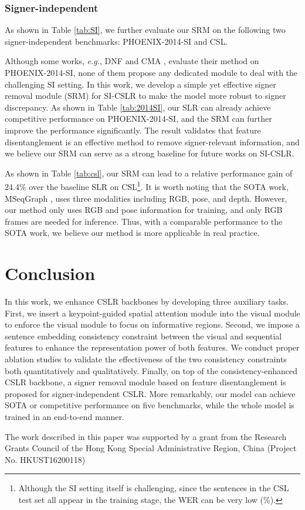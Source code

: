 \documentclass[acmsmall,screen]{acmart}
\def\eg{\emph{e.g.}} \def\Eg{\emph{E.g.}}
\begin{document}
 \subsubsection{Signer-independent}
As shown in Table \ref{tab:SI}, we further evaluate our SRM on the following two signer-independent benchmarks: PHOENIX-2014-SI and CSL.

Although some works, \eg, DNF \cite{dnf} and CMA \cite{cma}, evaluate their method on PHOENIX-2014-SI, none of them propose any dedicated module to deal with the challenging SI setting.
In this work, we develop a simple yet effective signer removal module (SRM) for SI-CSLR to make the model more robust to signer discrepancy. 
As shown in Table \ref{tab:2014SI}, our SLR can already achieve competitive performance on PHOENIX-2014-SI, and the SRM can further improve the performance significantly.
The result validates that feature disentanglement is an effective method to remove signer-relevant information, and we believe our SRM can serve as a strong baseline for future works on SI-CSLR.

As shown in Table \ref{tab:csl}, our SRM can lead to a relative performance gain of 24.4\% over the baseline SLR on CSL\footnote{Although the SI setting itself is challenging, since the sentences in the CSL test set all appear in the training stage, the WER can be very low (\%).}.
It is worth noting that the SOTA work, MSeqGraph \cite{tang2021graph}, uses three modalities including RGB, pose, and depth.
However, our method only uses RGB and pose information for training, and only RGB frames are needed for inference.
Thus, with a comparable performance to the SOTA work, we believe our method is more applicable in real practice.





















 \section{Conclusion}
In this work, we enhance CSLR backbones by developing three auxiliary tasks.
First, we insert a keypoint-guided spatial attention module into the visual module to enforce the visual module to focus on informative regions.
Second, we impose a sentence embedding consistency constraint between the visual and sequential features to enhance the representation power of both features.
We conduct proper ablation studies to validate the effectiveness of the two consistency constraints both quantitatively and qualitatively.
Finally, on top of the consistency-enhanced CSLR backbone, a signer removal module based on feature disentanglement is proposed for signer-independent CSLR.
More remarkably, our model can achieve SOTA or competitive performance on five benchmarks, while the whole model is trained in an end-to-end manner.

%
 
\begin{acks}
The work described in this paper was supported by a grant from the Research Grants Council of the Hong Kong Special Administrative Region, China (Project No. HKUST16200118)
\end{acks}



\end{document}
